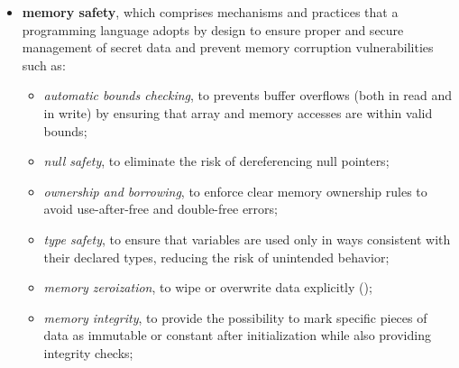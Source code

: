 \begin{itemize}
	
	\item \textbf{memory safety}, which comprises mechanisms and practices that a programming language adopts by design to ensure proper and secure management of secret data and prevent memory corruption vulnerabilities such as:
	\begin{itemize}
		\item \textit{automatic bounds checking}, to prevents buffer overflows (both in read and in write) by ensuring that array and memory accesses are within valid bounds;
		\item \textit{null safety}, to eliminate the risk of dereferencing null pointers;
		\item \textit{ownership and borrowing}, to enforce clear memory ownership rules to avoid use-after-free and double-free errors;
		\item \textit{type safety}, to ensure that variables are used only in ways consistent with their declared types, reducing the risk of unintended behavior;
		\item \textit{memory zeroization}, to wipe or overwrite data explicitly ();
		\item \textit{memory integrity}, to provide the possibility to mark specific pieces of data as immutable or constant after initialization while also providing integrity checks;
	\end{itemize}
	


\end{itemize}
